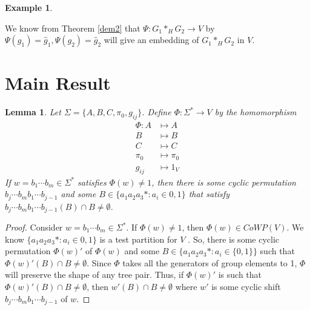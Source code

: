 \documentclass[11pt]{amsart}
\theoremstyle{plain}
\newtheorem{lemma}[theorem]{Lemma}
\theoremstyle{remark}
\theoremstyle{definition}
\newtheorem{example}[theorem]{Example}
\theoremstyle{remark}
\theoremstyle{named}
\begin{document}
\begin{example}
\begin{figure}[b]
\end{figure}

We know from Theorem \ref{dem2} that $\Psi: G_1 *_H G_2 \to V$ by $\Psi(g_1)=\hat{g}_1, \Psi(g_2)=\hat{g}_2$ will give an embedding of $G_1 *_H G_2$ in $V$.
\end{example}
\section{Main Result}

\begin{lemma} \label{testpartition}
Let $\Sigma = \{A,B,C,\pi_0,g_{ij}\}$. Define $\Phi: \Sigma^* \to V$ by the homomorphism 
\begin{align*}
\Phi: A &\mapsto A \\
B &\mapsto B \\
C &\mapsto C \\
\pi_0 &\mapsto \pi_0 \\
g_{ij} &\mapsto 1_V
\end{align*} 
If $w=b_1 \cdots b_m \in \Sigma^*$ satisfies $\Phi(w) \not= 1$, then there is some cyclic permutation $b_j \cdots b_mb_1 \cdots b_{j-1}$ and some $B \in \{a_1a_2a_3*:a_i \in {0,1}\}$ that satisfy $b_j \cdots b_mb_1 \cdots b_{j-1}(B)\cap B \not= \emptyset$.
\end{lemma}

\begin{proof}
Consider $w=b_1 \cdots b_m \in \Sigma^*$. If $\Phi(w) \not= 1$, then $\Phi(w) \in CoWP(V)$. We know $\{a_1a_2a_3*:a_i \in {0,1}\}$ is a test partition for $V$ \cite{Farley}. So, there is some cyclic permutation $\Phi(w)'$ of $\Phi(w)$ and some $B \in \{a_1a_2a_3*:a_i \in \{0,1\}\}$ such that $\Phi(w)'(B) \cap B \not= \emptyset$. Since $\Phi$ takes all the generators of group elements to 1, $\Phi$ will preserve the shape of any tree pair. Thus, if $\Phi(w)'$ is such that $\Phi(w)'(B) \cap B \not= \emptyset$, then $w'(B) \cap B \not= \emptyset$ where $w'$ is some cyclic shift $b_j \cdots b_mb_1 \cdots b_{j-1}$ of $w$. 
\end{proof}
\end{document}
